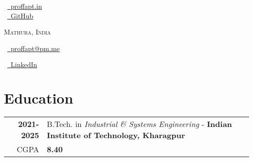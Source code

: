 \documentclass[a4paper,10pt]{extarticle} %
\begin{document}
\pagestyle{empty} %

\begin{multicols}{3}

\normalsize  \faGlobe\ {\href{https://proffapt.hashnode.dev/}{\  proffapt.in}}\\
\normalsize \faGithub\ {\href{https://github.com/proffapt}{\  GitHub}}\\
\columnbreak
\normalsize\par{\centering{\huge\textsc{\textcolor{primary}{Arpit Bhardwaj}}}\par} 
\par{\centering\normalsize {\textsc{Mathura, India}}\hfill\par}
\columnbreak
\raggedright\hfill\normalsize \faEnvelope\ {\href{mailto:proffapt@pm.me}{\  proffapt@pm.me}}\\
\raggedright\hfill\normalsize \faLinkedinSquare\ {\href{https://www.linkedin.com/in/proffapt}{\  LinkedIn}}\\
\end{multicols}
\vspace{-0.4 cm}

\section{\textcolor{primary}{Education}}
\vspace{+0.2cm}

\begin{tabular}{r|p{17.5cm}}	

 \textbf{2021-2025} & B.Tech. in \textit{Industrial \& Systems Engineering} - \textbf{Indian Institute of Technology, Kharagpur}\\
 \hfill CGPA & \textbf{8.40}\\
 
\end{tabular}

\vspace{+0.2cm}
\end{document}
